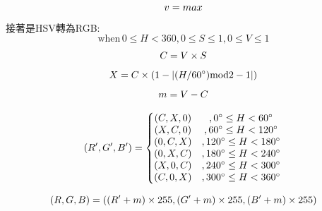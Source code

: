 \documentclass[14pt,a4paper]{report}  %
\begin{document}
\begin{enumerate}
$$
v=max\\$$
接著是HSV轉為RGB:
$$
\textrm{when}\,0\leq H< 360,0\leq S\leq 1,0\leq V\leq 1$$
$$
C=V\times S\\$$
$$
X=C\times (1-\left | (H/60^{\circ})\textrm{mod}2-1 \right |)\\$$
$$
m=V-C\\$$

$$
({R}',{G}',{B}')=\left\{\begin{matrix}
(C,X,0)& ,0^{\circ}\leq H< 60^{\circ}\\ 
 (X,C,0)& ,60^{\circ}\leq H< 120^{\circ}\\ 
 (0,C,X)& ,120^{\circ}\leq H< 180^{\circ}\\ 
 (0,X,C)& ,180^{\circ}\leq H< 240^{\circ}\\ 
 (X,0,C)& ,240^{\circ}\leq H< 300^{\circ}\\ 
 (C,0,X)& ,300^{\circ}\leq H< 360^{\circ}
\end{matrix}\right.\\$$

$$
(R,G,B)=(({R}'+m)\times 255,({G}'+m)\times 255,({B}'+m)\times 255)\\$$


\end{enumerate}
\end{document}
